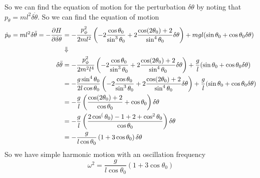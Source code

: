 \documentclass[11pt]{article}
\numberwithin{equation}{section}
\begin{document}
So we can find the equation of motion for the perturbation $\delta\theta$ by noting that
$p_{\theta} = ml^2\delta\dot{\theta}$. So we can find the equation of motion
\begin{align*}
\dot{p}_{\theta} = ml^2\delta\ddot{\theta} = -\frac{\partial{H}}{\partial{\delta\theta}} &= -\frac{p_{\phi}^2}{2ml^2}\left(-2\frac{\cos\theta_0}{\sin^3\theta_0} + 2\frac{\cos(2\theta_0)+2}{\sin^4\theta_0}\delta\theta\right) + mgl(\sin\theta_0 + \cos\theta_0\delta\theta)\\
&\Downarrow\\
\delta\ddot{\theta} &= -\frac{p_{\phi}^2}{2m^2l^4}\left(-2\frac{\cos\theta_0}{\sin^3\theta_0} + 2\frac{\cos(2\theta_0)+2}{\sin^4\theta_0}\delta\theta\right) + \frac{g}{l}(\sin\theta_0 + \cos\theta_0\delta\theta)\\
&= -\frac{g\sin^4\theta_0}{2l\cos\theta_0}\left(-2\frac{\cos\theta_0}{\sin^3\theta_0} + 2\frac{\cos(2\theta_0)+2}{\sin^4\theta_0}\delta\theta\right) + \frac{g}{l}(\sin\theta_0 + \cos\theta_0\delta\theta)\\
&= -\frac{g}{l}\left(\frac{\cos(2\theta_0)+2}{\cos\theta_0} + \cos\theta_0\right)\delta\theta\\
&= -\frac{g}{l}\left(\frac{2\cos^(\theta_0)-1+2 + \cos^2\theta_0}{\cos\theta_0}\right)\delta\theta\\
&= -\frac{g}{l\cos\theta_0}\left(1+3\cos\theta_0\right)\delta\theta
\end{align*}
So we have simple harmonic motion with an oscillation frequency
$$\omega^2 = \frac{g}{l\cos\theta_0}\left(1+3\cos\theta_0\right)$$

\pagebreak
\end{document}
